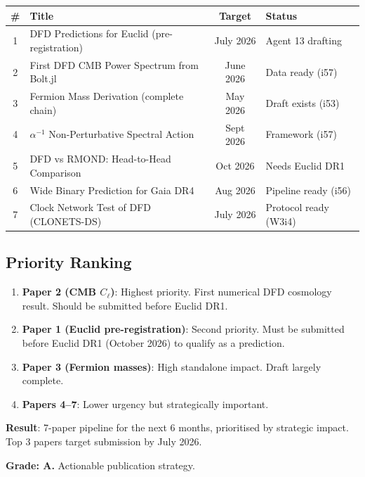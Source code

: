 \documentclass[11pt,a4paper]{article}
\begin{document}
\begin{center}
\begin{longtable}{clcl}
\toprule
\textbf{\#} & \textbf{Title} & \textbf{Target} & \textbf{Status} \\
\midrule
1 & DFD Predictions for Euclid (pre-registration) & July 2026 & Agent 13 drafting \\
2 & First DFD CMB Power Spectrum from Bolt.jl & June 2026 & Data ready (i57) \\
3 & Fermion Mass Derivation (complete chain) & May 2026 & Draft exists (i53) \\
4 & $\alpha^{-1}$ Non-Perturbative Spectral Action & Sept 2026 & Framework (i57) \\
5 & DFD vs RMOND: Head-to-Head Comparison & Oct 2026 & Needs Euclid DR1 \\
6 & Wide Binary Prediction for Gaia DR4 & Aug 2026 & Pipeline ready (i56) \\
7 & Clock Network Test of DFD (CLONETS-DS) & July 2026 & Protocol ready (W3i4) \\
\bottomrule
\end{longtable}
\end{center}

\subsection{Priority Ranking}

\begin{enumerate}
\item \textbf{Paper 2 (CMB $C_\ell$)}: Highest priority. First numerical DFD cosmology result. Should be submitted before Euclid DR1.
\item \textbf{Paper 1 (Euclid pre-registration)}: Second priority. Must be submitted before Euclid DR1 (October 2026) to qualify as a prediction.
\item \textbf{Paper 3 (Fermion masses)}: High standalone impact. Draft largely complete.
\item \textbf{Papers 4--7}: Lower urgency but strategically important.
\end{enumerate}

\begin{tcolorbox}[colback=blue!5!white, colframe=blue!60!black, title={Agent 18: Paper Pipeline --- 7 PAPERS PLANNED}]
\textbf{Result}: 7-paper pipeline for the next 6 months, prioritised by strategic impact. Top 3 papers target submission by July 2026.

\textbf{Grade: A.} Actionable publication strategy.
\end{tcolorbox}
\end{document}

